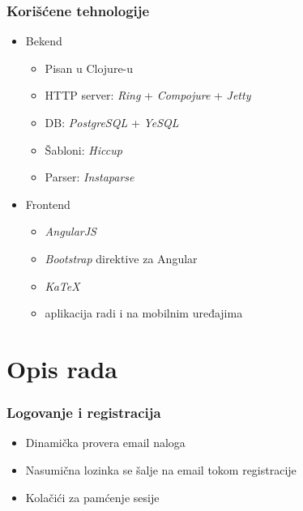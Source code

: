 \documentclass[compress,12pt,hyperref=unicode]{beamer}
\begin{document}
\begin{frame}
\frametitle{Korišćene tehnologije}
\begin{itemize}
\item Bekend
\begin{itemize}
\item Pisan u Clojure-u
\item HTTP server: \textit{Ring} + \textit{Compojure} + \textit{Jetty}
\item DB: \textit{PostgreSQL} + \textit{YeSQL}
\item Šabloni: \textit{Hiccup}
\item Parser: \textit{Instaparse}
\end{itemize}
\item Frontend
\begin{itemize}
\item \textit{AngularJS}
\item \textit{Bootstrap} direktive za Angular
\item \textit{KaTeX}
\item aplikacija radi i na mobilnim uređajima
\end{itemize}
\end{itemize}
\end{frame}

\section{Opis rada}
\begin{frame}
\frametitle{Logovanje i registracija}
\begin{center}
\end{center}
\begin{itemize}
\item Dinamička provera email naloga
\item Nasumična lozinka se šalje na email tokom registracije
\item Kolačići za pamćenje sesije
\end{itemize}
\end{frame}
\end{document}
